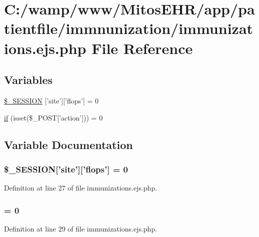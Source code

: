 \hypertarget{immunizations_8ejs_8php}{\section{\-C\-:/wamp/www/\-Mitos\-E\-H\-R/app/patientfile/immnunization/immunizations.ejs.\-php \-File \-Reference}
\label{immunizations_8ejs_8php}
}
\subsection*{\-Variables}
\begin{DoxyCompactItemize}
\item 
\hyperlink{immunizations_8ejs_8php_a99fda8552a3e58235643b79f5af3ded8}{\$\-\_\-\-S\-E\-S\-S\-I\-O\-N} \mbox{[}'site'\mbox{]}\mbox{[}'flops'\mbox{]} = 0
\item 
\hyperlink{immunizations_8ejs_8php_a8d5a88c29c26abdfa2ad05737bbe0ac9}{if} (isset(\$\-\_\-\-P\-O\-S\-T\mbox{[}'action'\mbox{]})) = 0
\end{DoxyCompactItemize}


\subsection{\-Variable \-Documentation}
\hypertarget{immunizations_8ejs_8php_a99fda8552a3e58235643b79f5af3ded8}{
\subsubsection[{\$\-\_\-\-S\-E\-S\-S\-I\-O\-N}]{\setlength{\rightskip}{0pt plus 5cm}\$\-\_\-\-S\-E\-S\-S\-I\-O\-N\mbox{[}'site'\mbox{]}\mbox{[}'flops'\mbox{]} = 0}}\label{immunizations_8ejs_8php_a99fda8552a3e58235643b79f5af3ded8}


\-Definition at line 27 of file immunizations.\-ejs.\-php.

\hypertarget{immunizations_8ejs_8php_a8d5a88c29c26abdfa2ad05737bbe0ac9}{
\subsubsection[{if}]{ = 0}}\label{immunizations_8ejs_8php_a8d5a88c29c26abdfa2ad05737bbe0ac9}


\-Definition at line 29 of file immunizations.\-ejs.\-php.

